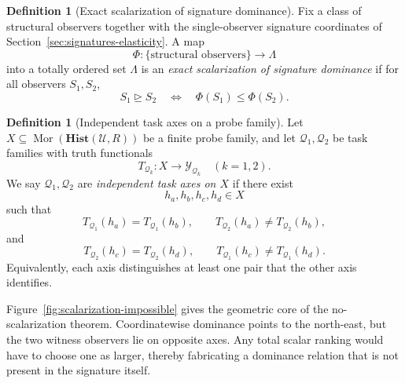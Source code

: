 \documentclass[11pt,twoside]{article}
\theoremstyle{definition}
\newtheorem{definition}[theorem]{Definition}
\newcommand{\Hist}{\mathbf{Hist}}
\DeclareMathOperator{\Mor}{Mor}
\begin{document}
\begin{definition}[Exact scalarization of signature dominance]
\label{def:exact-scalarization}
Fix a class of structural observers together with the single-observer signature coordinates of Section~\ref{sec:signatures-elasticity}. A map
\[
  \Phi : \{ \text{structural observers} \} \to \Lambda
\]
into a totally ordered set \(\Lambda\) is an \emph{exact scalarization of signature dominance} if for all observers \(S_1,S_2\),
\[
  S_1 \trianglerighteq S_2
  \quad\Longleftrightarrow\quad
  \Phi(S_1)\le \Phi(S_2).
\]
\end{definition}

\begin{definition}[Independent task axes on a probe family]
\label{def:independent-task-axes}
Let \(X\subseteq \Mor(\Hist(\mathcal{U},R))\) be a finite probe family, and let \(\mathcal{Q}_1,\mathcal{Q}_2\) be task families with truth functionals
\[
  T_{\mathcal{Q}_k}:X\to \mathcal{Y}_{\mathcal{Q}_k}
  \quad (k=1,2).
\]
We say \(\mathcal{Q}_1,\mathcal{Q}_2\) are \emph{independent task axes on \(X\)} if there exist
\[
  h_a,h_b,h_c,h_d\in X
\]
such that
\[
  T_{\mathcal{Q}_1}(h_a)=T_{\mathcal{Q}_1}(h_b),
  \qquad
  T_{\mathcal{Q}_2}(h_a)\neq T_{\mathcal{Q}_2}(h_b),
\]
and
\[
  T_{\mathcal{Q}_2}(h_c)=T_{\mathcal{Q}_2}(h_d),
  \qquad
  T_{\mathcal{Q}_1}(h_c)\neq T_{\mathcal{Q}_1}(h_d).
\]
Equivalently, each axis distinguishes at least one pair that the other axis identifies.
\end{definition}

Figure~\ref{fig:scalarization-impossible} gives the geometric core of the no-scalarization theorem. Coordinatewise dominance points to the north-east, but the two witness observers lie on opposite axes. Any total scalar ranking would have to choose one as larger, thereby fabricating a dominance relation that is not present in the signature itself.
\end{document}
